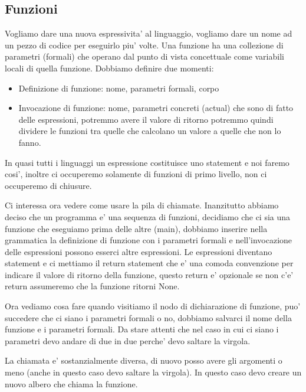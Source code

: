 \subsection{Funzioni}
Vogliamo dare una nuova espressivita' al linguaggio, vogliamo dare un nome ad un pezzo di codice per eseguirlo piu' volte. Una funzione ha una collezione di parametri (formali) che operano dal punto di vista concettuale come variabili locali di quella funzione.
Dobbiamo definire due momenti:
\begin{itemize}
    \item Definizione di funzione: nome, parametri formali, corpo
    \item Invocazione di funzione: nome, parametri concreti (actual) che sono di fatto delle espressioni, potremmo avere il valore di ritorno potremmo quindi dividere le funzioni tra quelle che calcolano un valore a quelle che non lo fanno.
\end{itemize}

In quasi tutti i linguaggi un espressione costituisce uno statement e noi faremo cosi', inoltre ci occuperemo solamente di funzioni di primo livello, non ci occuperemo di chiusure.

Ci interessa ora vedere come usare la pila di chiamate.
Inanzitutto abbiamo deciso che un programma e' una sequenza di funzioni, decidiamo che ci sia una funzione che eseguiamo prima delle altre (main), dobbiamo inserire nella grammatica la definizione di funzione con i parametri formali e nell'invocazione delle espressioni possono esserci altre espressioni. Le espressioni diventano statement e ci mettiamo il return statement che e' una comoda convenzione per indicare il valore di ritorno della funzione, questo return e' opzionale se non c'e' return assumeremo che la funzione ritorni None.

Ora vediamo cosa fare quando visitiamo il nodo di dichiarazione di funzione, puo' succedere che ci siano i parametri formali o no, dobbiamo salvarci il nome della funzione e i parametri formali. Da stare attenti che nel caso in cui ci siano i parametri devo andare di due in due perche' devo saltare la virgola.

La chiamata e' sostanzialmente diversa, di nuovo posso avere gli argomenti o meno (anche in questo caso devo saltare la virgola). In questo caso devo creare un nuovo albero che chiama la funzione.

